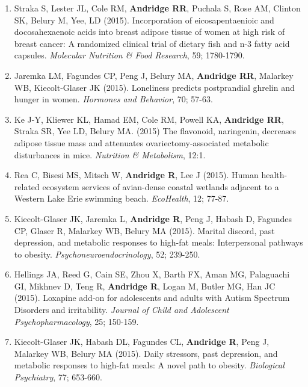 \documentclass[
  english,
  letterpaper,
  DIV=11,
  numbers=noendperiod]{scrartcl}
\begin{document}
\begin{enumerate}
  (2015). Interrelationships of more healthful and less healthful
  aspects of diet quality in a low-income community sample of
  preschool-aged children. \emph{Maternal and Child Health Journal}, 19;
  2663-2672.
\item
  Straka S, Lester JL, Cole RM, \textbf{Andridge RR}, Puchala S, Rose
  AM, Clinton SK, Belury M, Yee, LD (2015). Incorporation of
  eicosapentaenioic and docosahexaenoic acids into breast adipose tissue
  of women at high risk of breast cancer: A randomized clinical trial of
  dietary fish and n-3 fatty acid capsules. \emph{Molecular Nutrition \&
  Food Research}, 59; 1780-1790.
\item
  Jaremka LM, Fagundes CP, Peng J, Belury MA, \textbf{Andridge RR},
  Malarkey WB, Kiecolt-Glaser JK (2015). Loneliness predicts
  postprandial ghrelin and hunger in women. \emph{Hormones and
  Behavior}, 70; 57-63.
\item
  Ke J-Y, Kliewer KL, Hamad EM, Cole RM, Powell KA, \textbf{Andridge
  RR}, Straka SR, Yee LD, Belury MA. (2015) The flavonoid, naringenin,
  decreases adipose tissue mass and attenuates ovariectomy-associated
  metabolic disturbances in mice. \emph{Nutrition \& Metabolism}, 12:1.
\item
  Rea C, Bisesi MS, Mitsch W, \textbf{Andridge R}, Lee J (2015). Human
  health-related ecosystem services of avian-dense coastal wetlands
  adjacent to a Western Lake Erie swimming beach. \emph{EcoHealth}, 12;
  77-87.
\item
  Kiecolt-Glaser JK, Jaremka L, \textbf{Andridge R}, Peng J, Habash D,
  Fagundes CP, Glaser R, Malarkey WB, Belury MA (2015). Marital discord,
  past depression, and metabolic responses to high-fat meals:
  Interpersonal pathways to obesity. \emph{Psychoneuroendocrinology},
  52; 239-250.
\item
  Hellings JA, Reed G, Cain SE, Zhou X, Barth FX, Aman MG, Palaguachi
  GI, Mikhnev D, Teng R, \textbf{Andridge R}, Logan M, Butler MG, Han JC
  (2015). Loxapine add-on for adolescents and adults with Autism
  Spectrum Disorders and irritability. \emph{Journal of Child and
  Adolescent Psychopharmacology}, 25; 150-159.
\item
  Kiecolt-Glaser JK, Habash DL, Fagundes CL, \textbf{Andridge R}, Peng
  J, Malarkey WB, Belury MA (2015). Daily stressors, past depression,
  and metabolic responses to high-fat meals: A novel path to obesity.
  \emph{Biological Psychiatry}, 77; 653-660.


\end{enumerate}
\end{document}
